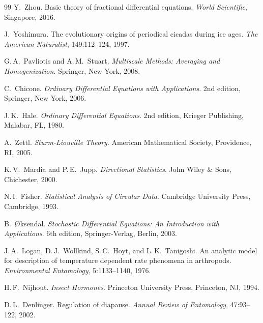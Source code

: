 ﻿\documentclass[12pt, a4paper]{article}
\theoremstyle{definition}
\begin{document}
\begin{thebibliography}{99}
Y.~Zhou.
\newblock Basic theory of fractional differential equations.
\newblock \emph{World Scientific}, Singapore, 2016.
 
J.~Yoshimura.
\newblock The evolutionary origins of periodical cicadas during ice ages.
\newblock \emph{The American Naturalist}, 149:112--124, 1997.
 
G.\,A.~Pavliotis and A.\,M.~Stuart.
\newblock \emph{Multiscale Methods: Averaging and Homogenization}.
\newblock Springer, New York, 2008.
 
 
C.~Chicone.
\newblock \emph{Ordinary Differential Equations with Applications}.
\newblock 2nd edition, Springer, New York, 2006.
 
J.\,K.~Hale.
\newblock \emph{Ordinary Differential Equations}.
\newblock 2nd edition, Krieger Publishing, Malabar, FL, 1980.
 
A.~Zettl.
\newblock \emph{Sturm-Liouville Theory}.
\newblock American Mathematical Society, Providence, RI, 2005.
 
K.\,V.~Mardia and P.\,E.~Jupp.
\newblock \emph{Directional Statistics}.
\newblock John Wiley \& Sons, Chichester, 2000.
 
N.\,I.~Fisher.
\newblock \emph{Statistical Analysis of Circular Data}.
\newblock Cambridge University Press, Cambridge, 1993.
 
B.~{\O}ksendal.
\newblock \emph{Stochastic Differential Equations: An Introduction with
  Applications}.
\newblock 6th edition, Springer-Verlag, Berlin, 2003.
 
J.\,A.~Logan, D.\,J.~Wollkind, S.\,C.~Hoyt, and L.\,K.~Tanigoshi.
\newblock An analytic model for description of temperature dependent rate
  phenomena in arthropods.
\newblock \emph{Environmental Entomology}, 5:1133--1140, 1976.
 
H.\,F.~Nijhout.
\newblock \emph{Insect Hormones}.
\newblock Princeton University Press, Princeton, NJ, 1994.
 
D.\,L.~Denlinger.
\newblock Regulation of diapause.
\newblock \emph{Annual Review of Entomology}, 47:93--122, 2002.
 

\end{thebibliography}
\end{document}
